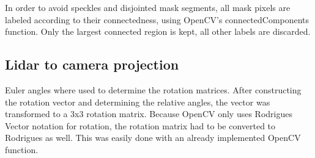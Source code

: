 In order to avoid speckles and disjointed mask segments, all mask pixels are labeled according to their connectedness, using OpenCV's connectedComponents function. Only the largest connected region is kept, all other labels are discarded. 

\subsection{Lidar to camera projection}

Euler angles where used to determine the rotation matrices. After constructing the rotation vector and determining the relative angles, the vector was transformed to a 3x3 rotation matrix. Because OpenCV only uses Rodrigues Vector notation for rotation, the rotation matrix had to be converted to Rodrigues as well. This was easily done with an already implemented OpenCV function.